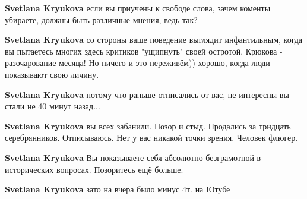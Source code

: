 \begin{itemize}
\begin{itemize}
\textbf{Svetlana Kryukova} если вы приучены к свободе слова, зачем коменты убираете, должны быть различные мнения, ведь так?

 
\textbf{Svetlana Kryukova} со стороны ваше поведение выглядит инфантильным, когда вы пытаетесь многих здесь критиков "ущипнуть" своей остротой. Крюкова - разочарование месяца! Но ничего и это переживём)) хорошо, когда люди показывают свою личину.

 
\textbf{Svetlana Kryukova} потому что раньше отписались от вас, не интересны вы стали не 40 минут назад...

 
\textbf{Svetlana Kryukova} вы всех забанили. Позор и стыд. Продались за тридцать серебрянников. Отписываюсь. Нет у вас никакой точки зрения. Человек флюгер.

 
\textbf{Svetlana Kryukova} Вы показываете себя абсолютно безграмотной в исторических вопросах. Позоритесь ещё больше.

 
\textbf{Svetlana Kryukova} зато на вчера было минус 4т. на Ютубе

 

\end{itemize}
\end{itemize}
